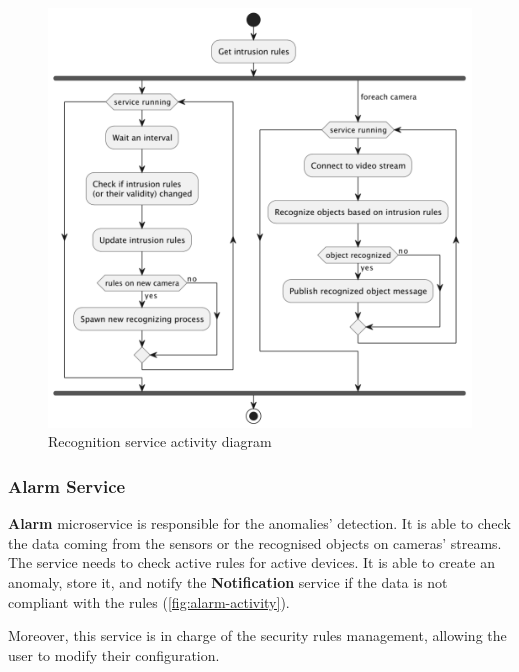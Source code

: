\documentclass{scrartcl}
\begin{document}
    \begin{figure}
        \centering
        \includegraphics[scale=0.6]{img/recognition-activity}
        \caption{Recognition service activity diagram}
        \label{fig:recognition-activity}
    \end{figure}


    \subsubsection{Alarm Service}

    \textbf{Alarm} microservice is responsible for the anomalies' detection.
    It is able to check the data coming from the sensors or the recognised objects on cameras' streams.
    The service needs to check active rules for active devices.
    It is able to create an anomaly, store it, and notify the \textbf{Notification} service if the data is not compliant with the rules (\cref{fig:alarm-activity}).

    Moreover, this service is in charge of the security rules management, allowing the user to modify their configuration.
\end{document}
